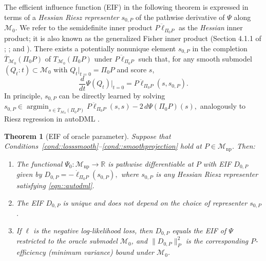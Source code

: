 \documentclass[11pt]{article}
\DeclareMathOperator*{\argmin}{argmin}
\newtheorem{theorem}{Theorem}
\theoremstyle{definition}
\begin{document}
The efficient influence function (EIF) in the following theorem is expressed in terms of a \textit{Hessian Riesz representer} \(s_{0,P}\) of the pathwise derivative of \(\Psi\) along \(\mathcal{M}_0\). We refer to the semidefinite inner product \(P\ddot{\ell}_{\Pi_0 P}\) as the \textit{Hessian} inner product; it is also known as the generalized Fisher inner product (Section 4.1.1 of \citealp{chen2014sieve}; \citealp{sieveOneStepPlugin}; and \citealp{van2025automatic2}). There exists a potentially nonunique element \(s_{0,P}\) in the completion $\overline{T}_{\mathcal{M}_0}(\Pi_0 P)$ of \(T_{\mathcal{M}_0}(\Pi_0 P)\) under \(P\ddot{\ell}_{\Pi_0 P}\) such that, for any smooth submodel \((Q_t:t)\subset \mathcal{M}_0\) with \(Q_t|_{t=0}=\Pi_0 P\) and score \(s\),
\begin{equation}
\frac{d}{dt}\Psi(Q_t)\Big|_{t=0}=P\ddot{\ell}_{\Pi_0 P}(s,s_{0,P}).
\label{eqn::autodml}
\end{equation}
In principle, \(s_{0,P}\) can be directly learned by solving $ s_{0,P} \in \argmin_{s \in \overline{T}_{\mathcal{M}_0}(\Pi_0 P)}
P\ddot{\ell}_{\Pi_0 P}(s,s)-2\,d\Psi(\Pi_0 P)(s),$
analogously to Riesz regression in autoDML \citep{chernozhukov2022automatic, van2025automatic2}.

  
\begin{theorem}[EIF of oracle parameter]
    \label{theorem::EIFmain} 
    Suppose that Conditions~\ref{cond::losssmooth}--\ref{cond::smoothprojection} hold at \(P \in \mathcal{M}_{\mathrm{np}}\). Then:
    \begin{enumerate}
        \item[(i)] The functional \(\Psi_0 : \mathcal{M}_{\mathrm{np}} \to \mathbb{R}\) is pathwise differentiable at \(P\) with EIF \(D_{0,P}\) given by $D_{0,P} = -\dot{\ell}_{\Pi_0 P}(s_{0,P}),$
        where \(s_{0,P}\) is any Hessian Riesz representer satisfying \eqref{eqn::autodml}.

        \item[(ii)] The EIF \(D_{0,P}\) is unique and does not depend on the choice of representer \(s_{0,P}\).

\item[(iii)] If \(\ell\) is the negative log-likelihood loss, then \(D_{0,P}\) equals the EIF of \(\Psi\) restricted to the oracle submodel \(\mathcal{M}_0\), and \(\|D_{0,P}\|_{P}^2\) is the corresponding \(P\)-efficiency (minimum variance) bound under \(\mathcal{M}_0\).

    \end{enumerate}
\end{theorem}
\end{document}
